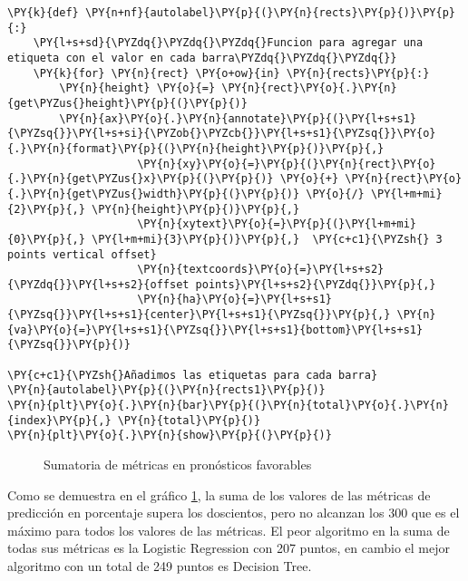 \begin{tcolorbox}[breakable, size=fbox, boxrule=1pt, pad at break*=1mm,colback=cellbackground, colframe=cellborder]
\begin{Verbatim}[commandchars=\\\{\}]
\PY{k}{def} \PY{n+nf}{autolabel}\PY{p}{(}\PY{n}{rects}\PY{p}{)}\PY{p}{:}
    \PY{l+s+sd}{\PYZdq{}\PYZdq{}\PYZdq{}Funcion para agregar una etiqueta con el valor en cada barra\PYZdq{}\PYZdq{}\PYZdq{}}
    \PY{k}{for} \PY{n}{rect} \PY{o+ow}{in} \PY{n}{rects}\PY{p}{:}
        \PY{n}{height} \PY{o}{=} \PY{n}{rect}\PY{o}{.}\PY{n}{get\PYZus{}height}\PY{p}{(}\PY{p}{)}
        \PY{n}{ax}\PY{o}{.}\PY{n}{annotate}\PY{p}{(}\PY{l+s+s1}{\PYZsq{}}\PY{l+s+si}{\PYZob{}\PYZcb{}}\PY{l+s+s1}{\PYZsq{}}\PY{o}{.}\PY{n}{format}\PY{p}{(}\PY{n}{height}\PY{p}{)}\PY{p}{,}
                    \PY{n}{xy}\PY{o}{=}\PY{p}{(}\PY{n}{rect}\PY{o}{.}\PY{n}{get\PYZus{}x}\PY{p}{(}\PY{p}{)} \PY{o}{+} \PY{n}{rect}\PY{o}{.}\PY{n}{get\PYZus{}width}\PY{p}{(}\PY{p}{)} \PY{o}{/} \PY{l+m+mi}{2}\PY{p}{,} \PY{n}{height}\PY{p}{)}\PY{p}{,}
                    \PY{n}{xytext}\PY{o}{=}\PY{p}{(}\PY{l+m+mi}{0}\PY{p}{,} \PY{l+m+mi}{3}\PY{p}{)}\PY{p}{,}  \PY{c+c1}{\PYZsh{} 3 points vertical offset}
                    \PY{n}{textcoords}\PY{o}{=}\PY{l+s+s2}{\PYZdq{}}\PY{l+s+s2}{offset points}\PY{l+s+s2}{\PYZdq{}}\PY{p}{,}
                    \PY{n}{ha}\PY{o}{=}\PY{l+s+s1}{\PYZsq{}}\PY{l+s+s1}{center}\PY{l+s+s1}{\PYZsq{}}\PY{p}{,} \PY{n}{va}\PY{o}{=}\PY{l+s+s1}{\PYZsq{}}\PY{l+s+s1}{bottom}\PY{l+s+s1}{\PYZsq{}}\PY{p}{)}

\PY{c+c1}{\PYZsh{}Añadimos las etiquetas para cada barra}
\PY{n}{autolabel}\PY{p}{(}\PY{n}{rects1}\PY{p}{)}
\PY{n}{plt}\PY{o}{.}\PY{n}{bar}\PY{p}{(}\PY{n}{total}\PY{o}{.}\PY{n}{index}\PY{p}{,} \PY{n}{total}\PY{p}{)}
\PY{n}{plt}\PY{o}{.}\PY{n}{show}\PY{p}{(}\PY{p}{)}
\end{Verbatim}
\end{tcolorbox}

\begin{center}
    	\begin{figure}[H]
	\centering
	\caption{Sumatoria de métricas en pronósticos favorables}
	\label{fig:smpf}
	\end{figure}
\end{center}
    
    Como se demuestra en el gráfico \ref{fig:smpf}, la suma de los valores de las métricas
de predicción en porcentaje supera los doscientos, pero no alcanzan los
300 que es el máximo para todos los valores de las métricas. El peor
algoritmo en la suma de todas sus métricas es la Logistic Regression con
207 puntos, en cambio el mejor algoritmo con un total de 249 puntos es
Decision Tree.

